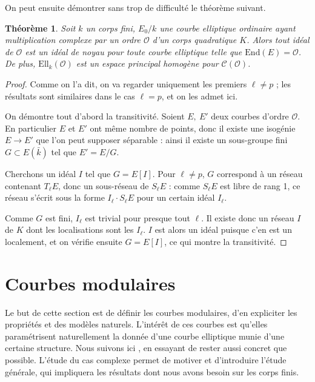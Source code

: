 \documentclass[11pt,a4paper]{article}
\renewcommand{\O}{\mathcal{O}}
\newcommand{\Cl}{\mathcal{C}}
\newcommand{\vers}{\longrightarrow}
\newcommand{\End}{\mathrm{End}}
\newcommand{\Ell}{\mathrm{Ell}}
\newtheorem*{thm}{Théorème}
\theoremstyle{definition}
\begin{document}
On peut ensuite démontrer sans trop de difficulté le théorème suivant.

\begin{thm}

Soit $k$ un corps fini, $E_0/k$ une courbe elliptique ordinaire ayant multiplication complexe par un ordre $\O$ d'un corps quadratique $K$. Alors tout idéal de $\O$ est un idéal de noyau pour toute courbe elliptique telle que $\End(E)=\O$. De plus, $\Ell_k(\O)$ est un espace principal homogène pour $\Cl(\O)$.

\end{thm}


\begin{proof}

Comme on l'a dit, on va regarder uniquement les premiers $\ell\neq p$ ; les résultats sont similaires dans le cas $\ell = p$, et on les admet ici.

On démontre tout d'abord la transitivité. Soient $E,\ E'$ deux courbes d'ordre $\O$. En particulier $E$ et $E'$ ont même nombre de points, donc il existe une isogénie $E \vers E'$ que l'on peut supposer séparable : ainsi il existe un sous-groupe fini $G\subset E(\bar{k})$ tel que $E' = E/G$.

Cherchons un idéal $I$ tel que $G = E[I]$. Pour $\ell\neq p$, $G$ correspond à un réseau contenant $T_\ell E$, donc un sous-réseau de $S_\ell E$ : comme $S_\ell E$ est libre de rang 1, ce réseau s'écrit sous la forme $I_\ell \cdot S_\ell E$ pour un certain idéal $I_\ell$.

Comme $G$ est fini, $I_\ell$ est trivial pour presque tout $\ell$. Il existe donc un réseau $I$ de $K$ dont les localisations sont les $I_\ell$. $I$ est alors un idéal puisque c'en est un localement, et on vérifie ensuite $G = E[I]$, ce qui montre la transitivité.

\end{proof}





\newpage

\section{Courbes modulaires}


Le but de cette section est de définir les courbes modulaires, d'en expliciter les propriétés et des modèles naturels. L'intérêt de ces courbes est qu'elles paramétrisent naturellement la donnée d'une courbe elliptique munie d'une certaine structure. Nous suivons ici \cite{KaMa}, en essayant de rester aussi concret que possible. L'étude du cas complexe permet de motiver et d'introduire l'étude générale, qui impliquera les résultats dont nous avons besoin sur les corps finis.
\end{document}
